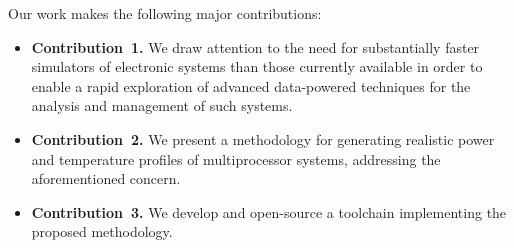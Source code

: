 Our work makes the following major contributions:

\begin{itemize}
  \item {\bfseries Contribution~1.} We draw attention to the need for
  substantially faster simulators of electronic systems than those currently
  available in order to enable a rapid exploration of advanced data-powered
  techniques for the analysis and management of such systems.

  \item {\bfseries Contribution~2.} We present a methodology for generating
  realistic power and temperature profiles of multiprocessor systems, addressing
  the aforementioned concern.

  \item {\bfseries Contribution~3.} We develop and open-source a toolchain
  implementing the proposed methodology.
\end{itemize}
